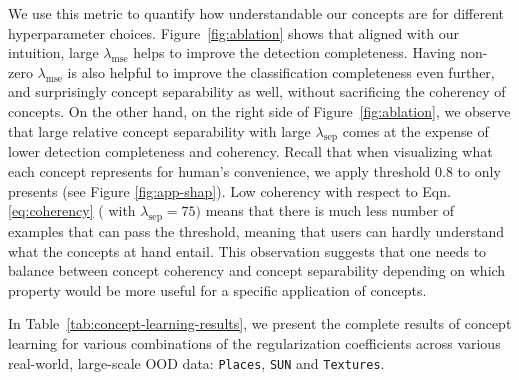We use this metric to quantify how understandable our concepts are for different hyperparameter choices. Figure~\ref{fig:ablation} shows that aligned with our intuition, large $\lambda_\textrm{mse}$ helps to improve the detection completeness. 
Having non-zero $\lambda_\textrm{mse}$ is also helpful to improve the classification completeness even further, and surprisingly concept separability as well, without sacrificing the coherency of concepts.
On the other hand, on the right side of Figure~\ref{fig:ablation}, we observe that large relative concept separability with large $\lambda_\textrm{sep}$ comes at the expense of lower detection completeness and coherency. 
Recall that when visualizing what each concept represents for human's convenience, we apply threshold 0.8 to only presents (see Figure \ref{fig:app-shap}). 
Low coherency with respect to Eqn. \ref{eq:coherency} ( with $\lambda_\textrm{sep} = 75)$ means that there is much less number of examples that can pass the threshold, meaning that users can hardly understand what the concepts at hand entail.
This observation suggests that one needs to balance between concept coherency and concept separability depending on which property would be more useful for a specific application of concepts.


In Table~\ref{tab:concept-learning-results}, we present the complete results of concept learning for various combinations of the regularization coefficients across various real-world, large-scale OOD data: \texttt{Places}, \texttt{SUN} and \texttt{Textures}.

